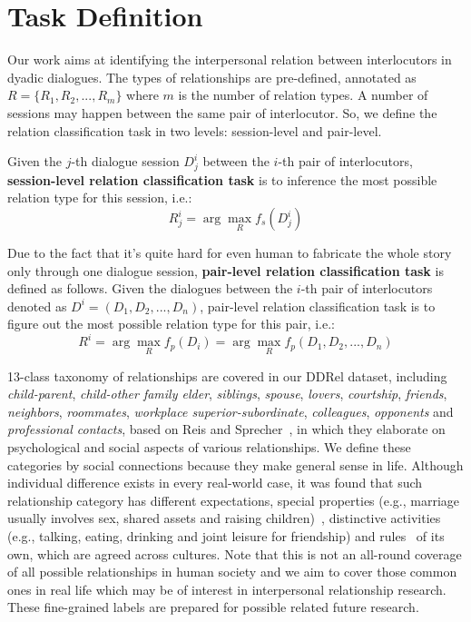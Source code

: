 \documentclass[letterpaper]{article} \usepackage{aaai21}  \usepackage{times}  \usepackage{helvet} \usepackage{courier}  \usepackage[hyphens]{url}  \usepackage{graphicx} \usepackage{xcolor}
\begin{document}
 
\section{Task Definition}
\label{sec:task}

Our work aims at identifying the interpersonal relation between interlocutors in dyadic dialogues. 
The types of relationships are pre-defined, annotated as $R=\{R_1, R_2, ..., R_m\}$ where $m$ is the number of relation types.
A number of sessions may happen between the same pair of interlocutor. So, we define the relation classification task in two levels: session-level and pair-level.

Given the $j$-th dialogue session $D_j^i$ between the $i$-th pair of interlocutors,  \textbf{session-level relation classification task} is to inference the most possible relation type for this session, i.e.:
\begin{equation}
R_j^i = \arg\max_{R} f_s(D_j^i)
\end{equation}

Due to the fact that it's quite hard for even human to fabricate the whole story only through one dialogue session, \textbf{pair-level relation classification task} is defined as follows. Given the dialogues between the $i$-th pair of interlocutors denoted as $D^i=(D_1, D_2, ..., D_n)$, pair-level relation classification task is to figure out the most possible relation type for this pair, i.e.:
\begin{equation}
R^i = \arg\max_{R}f_p(D_i) = \arg\max_{R}f_p(D_1, D_2, ..., D_n)
\end{equation}


13-class taxonomy of relationships are covered in our DDRel dataset, 
including {\em child-parent}, {\em child-other family elder}, {\em siblings}, {\em spouse}, {\em lovers}, {\em courtship}, {\em friends}, {\em neighbors}, {\em roommates}, 
{\em workplace superior-subordinate}, {\em colleagues}, {\em opponents} and 
{\em professional contacts},
based on Reis and Sprecher~\cite{reis2009encyclopedia}, 
in which they elaborate on psychological 
and social aspects of various relationships. 
We define these categories by social connections because they make general 
sense in life. Although individual difference exists 
in every real-world case, it was found that such relationship category 
has different expectations, 
special properties (e.g., marriage usually involves sex, 
shared assets and raising children)~\cite{argyle1983sources}, 
distinctive activities (e.g., talking, eating, drinking and 
joint leisure for friendship) and 
rules~\cite{argyle1984rules} of its own, which are agreed across cultures.
Note that this is not an all-round coverage of 
all possible relationships in human society 
and we aim to cover those common
ones in real life which may be of interest in interpersonal 
relationship research.
These fine-grained labels are prepared for possible related future research.
\end{document}
